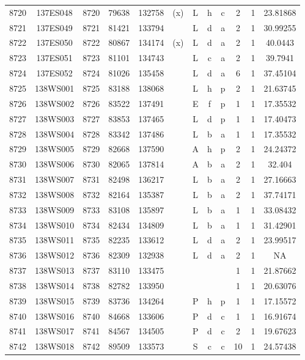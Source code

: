 \begin{tabular}{|*{12}{c|}}
8720 & 137ES048 & 8720 & 79638 & 132758 & (x) & L & h & c & 2 & 1 & 23.81868 \\ 
8721 & 137ES049 & 8721 & 81421 & 133794 &  & L & d & a & 2 & 1 & 30.99255 \\ 
8722 & 137ES050 & 8722 & 80867 & 134174 & (x) & L & d & a & 2 & 1 & 40.0443 \\ 
8723 & 137ES051 & 8723 & 81101 & 134743 &  & L & c & a & 2 & 1 & 39.7941 \\ 
8724 & 137ES052 & 8724 & 81026 & 135458 &  & L & d & a & 6 & 1 & 37.45104 \\ 
8725 & 138WS001 & 8725 & 83188 & 138068 &  & L & h & p & 2 & 1 & 21.63745 \\ 
8726 & 138WS002 & 8726 & 83522 & 137491 &  & E & f & p & 1 & 1 & 17.35532 \\ 
8727 & 138WS003 & 8727 & 83853 & 137465 &  & L & d & p & 1 & 1 & 17.40473 \\ 
8728 & 138WS004 & 8728 & 83342 & 137486 &  & L & b & a & 1 & 1 & 17.35532 \\ 
8729 & 138WS005 & 8729 & 82668 & 137590 &  & A & h & p & 2 & 1 & 24.24372 \\ 
8730 & 138WS006 & 8730 & 82065 & 137814 &  & A & b & a & 2 & 1 & 32.404 \\ 
8731 & 138WS007 & 8731 & 82498 & 136217 &  & L & b & a & 2 & 1 & 27.16663 \\ 
8732 & 138WS008 & 8732 & 82164 & 135387 &  & L & b & a & 2 & 1 & 37.74171 \\ 
8733 & 138WS009 & 8733 & 83108 & 135897 &  & L & b & a & 1 & 1 & 33.08432 \\ 
8734 & 138WS010 & 8734 & 82434 & 134809 &  & L & b & a & 1 & 1 & 31.42901 \\ 
8735 & 138WS011 & 8735 & 82235 & 133612 &  & L & d & a & 2 & 1 & 23.99517 \\ 
8736 & 138WS012 & 8736 & 82309 & 132938 &  & L & d & a & 2 & 1 & NA \\ 
8737 & 138WS013 & 8737 & 83110 & 133475 &  &  &  &  & 1 & 1 & 21.87662 \\ 
8738 & 138WS014 & 8738 & 82782 & 133950 &  &  &  &  & 1 & 1 & 20.63076 \\ 
8739 & 138WS015 & 8739 & 83736 & 134264 &  & P & h & p & 1 & 1 & 17.15572 \\ 
8740 & 138WS016 & 8740 & 84668 & 133606 &  & P & d & c & 1 & 1 & 16.91674 \\ 
8741 & 138WS017 & 8741 & 84567 & 134505 &  & P & d & c & 2 & 1 & 19.67623 \\ 
8742 & 138WS018 & 8742 & 89509 & 133573 &  & S & c & c & 10 & 1 & 24.57438 \\ 

\end{tabular}

